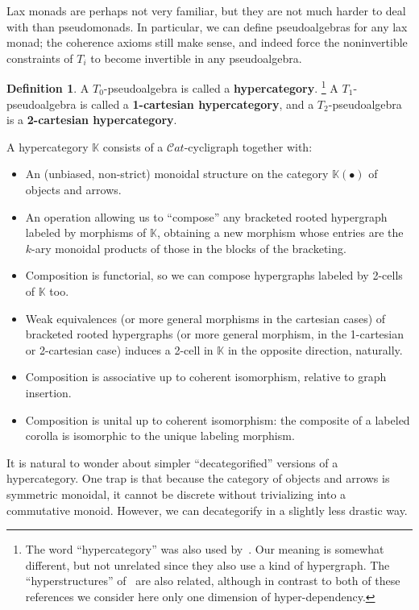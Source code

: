\documentclass{article}
\theoremstyle{definition}
\newtheorem{defn}[thm]{Definition}
\theoremstyle{remark}
\def\K{\mathbb{K}}
\def\Cat{\ensuremath{\mathcal{C}\mathit{at}}}
\begin{document}
Lax monads are perhaps not very familiar, but they are not much harder to deal with than pseudomonads.
In particular, we can define pseudoalgebras for any lax monad; the coherence axioms still make sense, and indeed force the noninvertible constraints of $T_i$ to become invertible in any pseudoalgebra.

\begin{defn}
  A $T_0$-pseudoalgebra is called a \textbf{hypercategory}.%
  \footnote{The word ``hypercategory'' was also used by~\cite{hmt:strict-n-hypercats,mt:omega-hypergraphs}.
    Our meaning is somewhat different, but not unrelated since they also use a kind of hypergraph.
    The ``hyperstructures'' of~\cite{baas:higher-structures} are also related, although in contrast to both of these references we consider here only one dimension of hyper-dependency.}
  A $T_1$-pseudoalgebra is called a \textbf{1-cartesian hypercategory}, and a $T_2$-pseudoalgebra is a \textbf{2-cartesian hypercategory}.
\end{defn}

A hypercategory $\K$ consists of a $\Cat$-cycligraph together with:
\begin{itemize}
\item An (unbiased, non-strict) monoidal structure on the category $\K(\bullet)$ of objects and arrows.
\item An operation allowing us to ``compose'' any bracketed rooted hypergraph labeled by morphisms of $\K$, obtaining a new morphism whose entries are the $k$-ary monoidal products of those in the blocks of the bracketing.
\item Composition is functorial, so we can compose hypergraphs labeled by 2-cells of $\K$ too.
\item Weak equivalences (or more general morphisms in the cartesian cases) of bracketed rooted hypergraphs (or more general morphism, in the 1-cartesian or 2-cartesian case) induces a 2-cell in $\K$ in the opposite direction, naturally.
\item Composition is associative up to coherent isomorphism, relative to graph insertion.
\item Composition is unital up to coherent isomorphism: the composite of a labeled corolla is isomorphic to the unique labeling morphism.
\end{itemize}

It is natural to wonder about simpler ``decategorified'' versions of a hypercategory.
One trap is that because the category of objects and arrows is symmetric monoidal, it cannot be discrete without trivializing into a commutative monoid.
However, we can decategorify in a slightly less drastic way.
\end{document}
